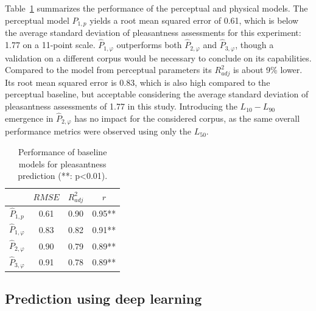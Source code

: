 \documentclass[twocolumn]{article}
\begin{document}
Table~\ref{tab:pleasm} summarizes the performance of the perceptual and physical models. The perceptual model $\hat P_{1, p}$ yields a root mean squared error of 0.61, which is below the average standard deviation of pleasantness assessments for this experiment: 1.77 on a 11-point scale. $\hat P_{1, \varphi}$ outperforms both $\hat P_{2, \varphi}$ and $\hat P_{3, \varphi}$, though a validation on a different corpus would be necessary to conclude on its capabilities. Compared to the model from perceptual parameters its $R^2_{adj}$ is about 9\% lower. Its root mean squared error is 0.83, which is also high compared to the perceptual baseline, but acceptable considering the average standard deviation of pleasantness assessments of 1.77 in this study. Introducing the $L_{10}-L_{90}$ emergence in $\hat P_{2, \varphi}$ has no impact for the considered corpus, as the same overall performance metrics were observed using only the $L_{50}$.

\begin{table}[h]
\centering
\caption{Performance of baseline models for pleasantness prediction (**: p<0.01).}
\label{tab:pleasm}
\begin{tabular}{ c | c | c | c }
\hline
	 & $RMSE$ & $R^2_{adj}$ & $r$ \\ \hline
	$\hat P_{1, p}$ & 0.61 & 0.90 & 0.95** \\ \hline
	$\hat P_{1, \varphi}$ & 0.83 & 0.82 & 0.91** \\
	$\hat P_{2, \varphi}$ & 0.90 & 0.79 & 0.89** \\
	$\hat P_{3, \varphi}$ & 0.91 & 0.78 & 0.89** \\ \hline
\end{tabular}
\end{table}


\subsection{Prediction using deep learning}
\label{sec:app_deep}
\end{document}
